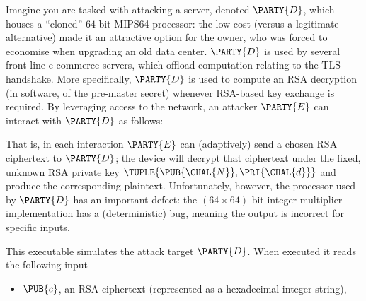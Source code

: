 %



Imagine you are tasked with attacking a server, denoted $\PARTY{D}$, 
which houses a ``cloned'' $64$-bit MIPS64 processor: the low cost (versus a 
legitimate alternative) made it an attractive option for the owner, who was
forced to economise when upgrading an old data center.
$\PARTY{D}$ is used by several front-line e-commerce servers, which offload
computation relating to the TLS handshake.  More specifically, $\PARTY{D}$ 
is used to compute an RSA decryption (in software, of the pre-master secret)
whenever RSA-based key exchange is required.
By leveraging access to the network, 
an attacker $\PARTY{E}$ can interact with $\PARTY{D}$ as follows:

\begin{center}

\end{center}

\noindent
That is, in each interaction $\PARTY{E}$ can (adaptively) send 
a chosen RSA ciphertext
to $\PARTY{D}$; the device will
decrypt that ciphertext under the fixed, unknown RSA private key $\TUPLE{ \PUB{\CHAL{N}}, \PRI{\CHAL{d}} }$ 
and produce 
the corresponding  plaintext.
Unfortunately, however, the processor used by $\PARTY{D}$ has an important
defect: the $( 64 \times 64 )$-bit integer multiplier implementation has a
(deterministic) bug, meaning the output is incorrect for specific inputs.




This executable simulates the attack target $\PARTY{D}$.  When executed it 
 reads the following  input

\begin{itemize}
\item $\PUB{c}$,
      an RSA ciphertext
      (represented as a                   hexadecimal integer string),
\end{itemize}

